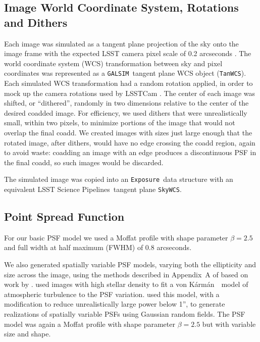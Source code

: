 \documentclass[twocolumn,twocolappendix,astrosym]{openjournal}
\newcommand{\galsim}{\texttt{GALSIM}}
\newcommand{\calexp}{\texttt{Exposure}}
\newcommand{\dm}{LSST Science Pipelines}
\newcommand{\vonkarman}{{von K\'arm\'an}~}
\begin{document}
\subsection{Image World Coordinate System, Rotations and Dithers} \label{sec:sim:rotdith}

Each image was simulated as a tangent plane projection of the sky onto the
image frame with the expected LSST camera pixel scale of 0.2 arcseconds
\citep{IvezicLSST2008}.  The world coordinate system (WCS) transformation between
sky and pixel coordinates was represented as a \galsim\ tangent plane
WCS object (\texttt{TanWCS}).
Each simulated WCS transformation had a random rotation applied, in order to
mock up the camera rotations used by LSSTCam \citep{IvezicLSST2008}.  The
center of each image was shifted, or ``dithered'', randomly in two dimensions
relative to the center of the desired coadded image.  For efficiency, we used
dithers that were unrealistically small, within two pixels, to minimize portions of the
image that would not overlap the final coadd.  We created images with sizes just
large enough that the rotated image, after dithers, would have no edge
crossing the coadd region, again to avoid waste:  coadding an image with an
edge produces a discontinuous PSF in the final coadd, so such images would be
discarded.

The simulated image was copied into an \calexp\ data structure with an
equivalent \dm\ tangent plane \texttt{SkyWCS}.

\subsection{Point Spread Function} \label{sec:sim:psfs}

For our basic PSF model we used a Moffat profile \citep{Moffat1969} with shape
parameter $\beta=2.5$ and full width at half maximum (FWHM) of 0.8 arcseconds.

We also generated spatially variable PSF models, varying both the ellipticity
and size across the image, using the methods described in Appendix~A of
\citet{mdet20} based on work by \citet{heymans2012}.  \citet{heymans2012} used
images with high stellar density to fit a \vonkarman\ model of atmospheric
turbulence to the PSF variation. \citet{mdet20} used this model, with a
modification to reduce unrealistically large power below 1'', to generate
realizations of spatially variable PSFs using Gaussian random fields. The PSF
model was again a Moffat profile with shape parameter $\beta=2.5$ but with
variable size and shape.
\end{document}
